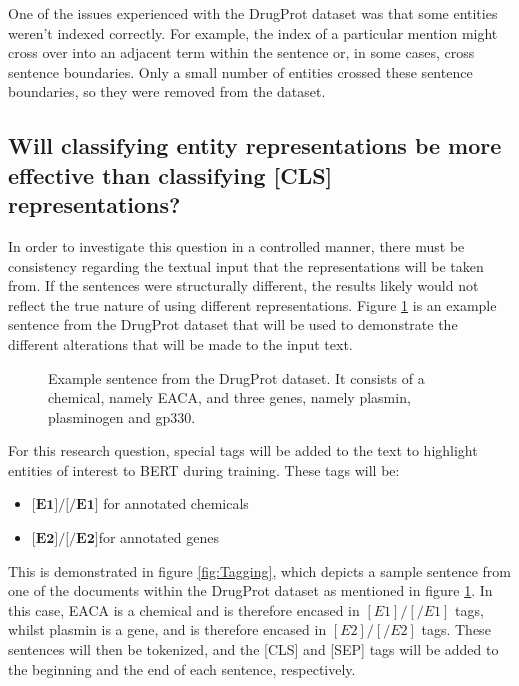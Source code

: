 \documentclass{l4proj}
\begin{document}
One of the issues experienced with the DrugProt dataset was that some entities weren't indexed correctly. For example, the index of a particular mention might cross over into an adjacent term within the sentence or, in some cases, cross sentence boundaries. Only a small number of entities crossed these sentence boundaries, so they were removed from the dataset.

\subsection{Will classifying entity representations be more effective than classifying [CLS] representations?}

In order to investigate this question in a controlled manner, there must be consistency regarding the textual input that the representations will be taken from. If the sentences were structurally different, the results likely would not reflect the true nature of using different representations. Figure \ref{fig:Sentence} is an example sentence from the DrugProt dataset that will be used to demonstrate the different alterations that will be made to the input text.

\begin{figure}[h]
    \centering
  \caption{Example sentence from the DrugProt dataset. It consists of a chemical, namely EACA, and three genes, namely plasmin, plasminogen and gp330. }
  \label{fig:Sentence}
\end{figure}For this research question, special tags will be added to the text to highlight entities of interest to BERT during training. These tags will be:

\begin{itemize}
\item $\textbf{[E1]/[/E1]}$ for annotated chemicals
\item $\textbf{[E2]/[/E2]}$for annotated genes
\end{itemize}

This is demonstrated in figure \ref{fig:Tagging}, which depicts a sample sentence from one of the documents within the DrugProt dataset as mentioned in figure \ref{fig:Sentence}. In this case, EACA is a chemical and is therefore encased in $[E1]/[/E1]$ tags, whilst plasmin is a gene, and is therefore encased in $[E2]/[/E2]$ tags. These sentences will then be tokenized, and the [CLS] and [SEP] tags will be added to the beginning and the end of each sentence, respectively. 
\end{document}
